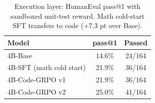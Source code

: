 
\begin{table}[t]
  \centering
  \caption{Execution layer: HumanEval pass@1 with sandboxed unit-test reward. Math cold-start SFT transfers to code (+7.3 pt over Base).}
  \label{tab:humaneval}
  \begin{tabular}{lcc}
    \toprule
    Model & pass@1 & Passed \\
    \midrule
    4B-Base & 14.6\% & 24/164 \\
    4B-SFT (math cold start) & 21.9\% & 36/164 \\
    4B-Code-GRPO v1 & 21.9\% & 36/164 \\
    4B-Code-GRPO v2 & 25.0\% & 41/164 \\
    \bottomrule
  \end{tabular}
\end{table}
